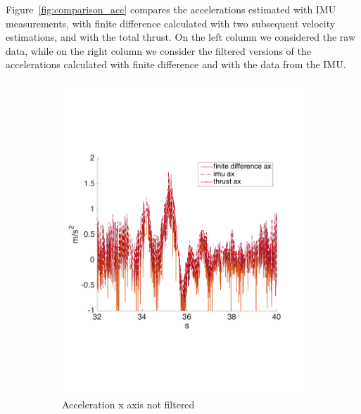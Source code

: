 Figure~\ref{fig:comparison_acc} compares the accelerations estimated with IMU measurements, with finite difference calculated with two subsequent velocity estimations, and with the total thrust. On the left column we considered the raw data, while on the right column we consider the filtered versions of the accelerations calculated with finite difference and with the data from the IMU.
\begin{figure}[!htbp]
 \centering   
     \begin{subfigure}[b]{0.45\textwidth}
     \includegraphics[width=\textwidth]{img/acceleration_mass_changed_no_filter_x.pdf}
        \caption{Acceleration x axis not filtered}
        \label{fig:comparison_accx}
   \end{subfigure}
    \begin{subfigure}[b]{0.45\textwidth}

\end{subfigure}
\end{figure}
